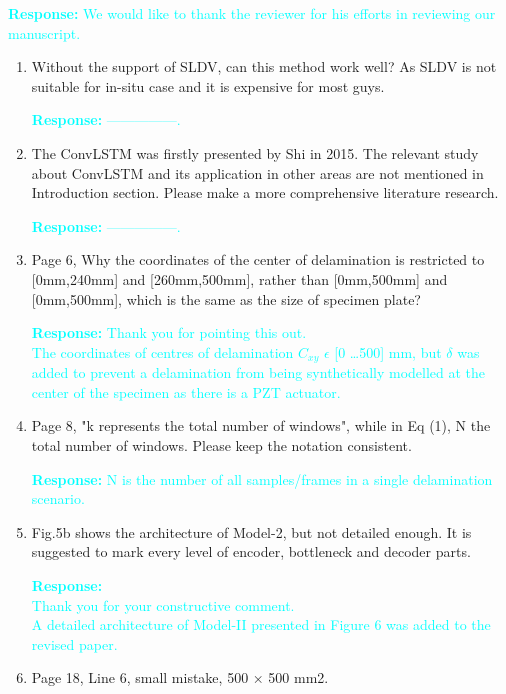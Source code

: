 \documentclass[11pt,a2paper]{report}
\begin{document}
\textcolor{Cyan}{
	\newline\textbf{Response:}
	We would like to thank the reviewer for his efforts in reviewing our 
	manuscript.
}
\begin{enumerate}
	\item Without the support of SLDV, can this method work well? As SLDV is 
	not suitable for in-situ case and it is expensive for most guys.
	
	\textcolor{Cyan}{
		\textbf{Response:}
		---------------.
	}
	
	\item The ConvLSTM was firstly presented by Shi in 2015.
	The relevant study about ConvLSTM and its application in other areas are 
	not mentioned in Introduction section.
	Please make a more comprehensive literature research.
	
	\textcolor{Cyan}{
		\textbf{Response:}
		---------------.
	}
	\item Page 6, Why the coordinates of the center of delamination is 
	restricted to [0mm,240mm] and [260mm,500mm], rather than [0mm,500mm] and 
	[0mm,500mm], which is the same as the size of specimen plate?
	
	\textcolor{Cyan}{
		\textbf{Response:}
		Thank you for pointing this out.\\
		The coordinates of centres of delamination \(C_{xy}\) $\epsilon$ [0 \dots 500] mm, but $\delta$ was added to prevent a delamination from being synthetically modelled at the center of the specimen as there is a PZT actuator.
	}
	
	\item Page 8, "k represents the total number of windows", while in Eq (1), 
	N the total number of windows.
	Please keep the notation consistent.
	
	\textcolor{Cyan}{
		\textbf{Response:}
		N is the number of all samples/frames in a single delamination scenario.
	}	
	
	\item Fig.5b shows the architecture of Model-2, but not detailed enough.
	It is suggested to mark every level of encoder, bottleneck and decoder 
	parts.
	
	\textcolor{Cyan}{
		\textbf{Response:} \\
		Thank you for your constructive comment.\\
		A detailed architecture of Model-II presented in Figure 6 was added to the revised paper.
	}
	
	\item Page 18, Line 6, small mistake, 500 × 500 mm2.
	

\end{enumerate}
\end{document}
